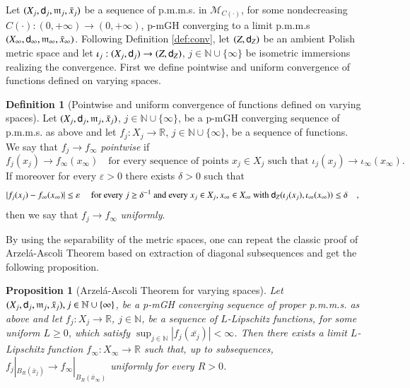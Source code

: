 \documentclass[11pt,reqno]{amsart}
\newcommand{\MM}{\mathscr{M}}
\newcommand{\mm}{\mathfrak m}
\newcommand{\sfd}{{\sf d}}
\newcommand{\R}{\mathbb{R}}
\newcommand{\N}{\mathbb{N}}
\newcommand{\vare}{\varepsilon}
\newtheorem{proposition}[theorem]{Proposition}
\theoremstyle{definition}
\newtheorem{definition}[theorem]{Definition}
\theoremstyle{remark}
\theoremstyle{remark}
\theoremstyle{remark}
\theoremstyle{remark}
\theoremstyle{remark}
\theoremstyle{remark}
\theoremstyle{remark}
\begin{document}
Let $(X_j, \sfd_j, \mm_j, \bar{x}_j)$ be a sequence of p.m.m.s.  in $\MM_{C(\cdot)}$, for some nondecreasing $C(\cdot):(0,+\infty)\to (0,+\infty)$,  p-mGH converging to  a limit p.m.m.s $(X_\infty, \sfd_\infty, \mm_\infty, \bar{x}_\infty)$. Following Definition \ref{def:conv}, let  $(Z,\sfd_Z)$ be an ambient Polish  metric space and let $\iota_j:(X_j, \sfd_j) \to (Z,\sfd_Z)$, $j \in \N\cup \{\infty\}$ be isometric immersions realizing the convergence.  
First we define  pointwise and uniform convergence of functions defined on varying spaces.

\begin{definition}[Pointwise and uniform convergence of functions defined on varying spaces]
Let $(X_j, \sfd_j, \mm_j, \bar{x}_j)$, $j\in \N\cup \{\infty\}$, be a p-mGH converging sequence of p.m.m.s. as above and let   $f_j:X_j \to \R$, $j \in \N \cup \{\infty\}$, be  a sequence of functions. We say that $f_j\to f_\infty$ \emph{pointwise}  if 
\begin{equation}\label{eq:DefPointConv}
f_j(x_j)\to f_\infty(x_\infty) \quad \text{for every sequence of points $x_j \in X_j$ such that } \iota_j(x_j)\to \iota_\infty(x_\infty) .
\end{equation}
If moreover for every $\vare>0$ there exists $\delta>0$ such that 
\begin{equation}\label{eq:DefPointConv}
|f_j(x_j)- f_\infty(x_\infty)| \leq \vare \quad \text{ for every $j\geq \delta^{-1}$ and every   $x_j \in X_j, x_\infty \in X_\infty$ with  $\sfd_{Z}(\iota_j(x_j),\iota_\infty(x_\infty)) \leq \delta$\quad,    } 
\end{equation}
then we say that $f_j\to f_\infty$ \emph{uniformly}. 
\end{definition}

By using the separability of the metric spaces, one can repeat the classic proof of Arzel\'a-Ascoli Theorem based on extraction of  diagonal subsequences  and get the following proposition.

\begin{proposition} [Arzel\'a-Ascoli Theorem for varying spaces] \label{Prop:AscArz}
Let $(X_j, \sfd_j, \mm_j, \bar{x}_j), j\in \N\cup \{\infty\}$, be a p-mGH converging sequence of proper p.m.m.s. as above and let   $f_j:X_j \to \R$, $j \in \N$, be  a sequence of $L$-Lipschitz   functions, for some uniform $L \geq 0$, which satisfy $\sup_{j \in \N} |f_j(\bar{x_j})|< \infty$.  Then there exists a limit $L$-Lipschitz function $f_\infty: X_\infty \to \R$ such that, up to subsequences,  $f_j|_{B_R(\bar{x}_j)} \to f_\infty|_{B_R(\bar{x}_\infty)}$ uniformly for every $R>0$. 
\end{proposition}
\end{document}
